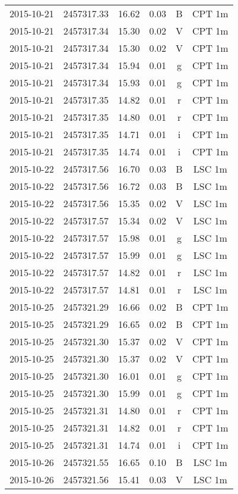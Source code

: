 \begin{table}
\begin{tabular}{cccccc}
2015-10-21 & 2457317.33 & 16.62 & 0.03 & B & CPT 1m \\
2015-10-21 & 2457317.34 & 15.30 & 0.02 & V & CPT 1m \\
2015-10-21 & 2457317.34 & 15.30 & 0.02 & V & CPT 1m \\
2015-10-21 & 2457317.34 & 15.94 & 0.01 & g & CPT 1m \\
2015-10-21 & 2457317.34 & 15.93 & 0.01 & g & CPT 1m \\
2015-10-21 & 2457317.35 & 14.82 & 0.01 & r & CPT 1m \\
2015-10-21 & 2457317.35 & 14.80 & 0.01 & r & CPT 1m \\
2015-10-21 & 2457317.35 & 14.71 & 0.01 & i & CPT 1m \\
2015-10-21 & 2457317.35 & 14.74 & 0.01 & i & CPT 1m \\
2015-10-22 & 2457317.56 & 16.70 & 0.03 & B & LSC 1m \\
2015-10-22 & 2457317.56 & 16.72 & 0.03 & B & LSC 1m \\
2015-10-22 & 2457317.56 & 15.35 & 0.02 & V & LSC 1m \\
2015-10-22 & 2457317.57 & 15.34 & 0.02 & V & LSC 1m \\
2015-10-22 & 2457317.57 & 15.98 & 0.01 & g & LSC 1m \\
2015-10-22 & 2457317.57 & 15.99 & 0.01 & g & LSC 1m \\
2015-10-22 & 2457317.57 & 14.82 & 0.01 & r & LSC 1m \\
2015-10-22 & 2457317.57 & 14.81 & 0.01 & r & LSC 1m \\
2015-10-25 & 2457321.29 & 16.66 & 0.02 & B & CPT 1m \\
2015-10-25 & 2457321.29 & 16.65 & 0.02 & B & CPT 1m \\
2015-10-25 & 2457321.30 & 15.37 & 0.02 & V & CPT 1m \\
2015-10-25 & 2457321.30 & 15.37 & 0.02 & V & CPT 1m \\
2015-10-25 & 2457321.30 & 16.01 & 0.01 & g & CPT 1m \\
2015-10-25 & 2457321.30 & 15.99 & 0.01 & g & CPT 1m \\
2015-10-25 & 2457321.31 & 14.80 & 0.01 & r & CPT 1m \\
2015-10-25 & 2457321.31 & 14.82 & 0.01 & r & CPT 1m \\
2015-10-25 & 2457321.31 & 14.74 & 0.01 & i & CPT 1m \\
2015-10-26 & 2457321.55 & 16.65 & 0.10 & B & LSC 1m \\
2015-10-26 & 2457321.56 & 15.41 & 0.03 & V & LSC 1m \\

\end{tabular}
\end{table}
